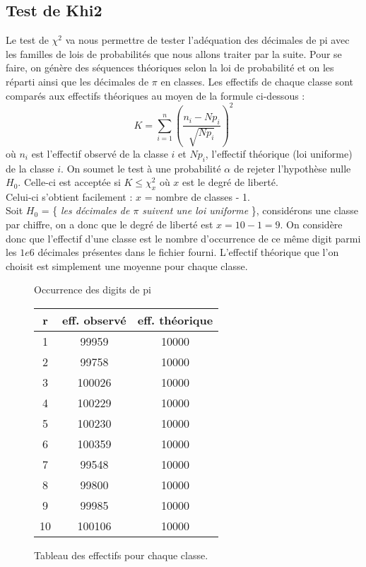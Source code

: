 \documentclass[a4paper,10pt]{article}
\begin{document}
\subsection{Test de Khi2}
Le test de $\chi^2$ va nous permettre de tester l'adéquation des décimales de pi avec les familles de lois de probabilités que nous allons traiter par la suite. Pour se faire, on génère des séquences théoriques selon la loi de probabilité et on les réparti ainsi que les décimales de $\pi$ en classes. Les effectifs de chaque classe sont comparés aux effectifs théoriques au moyen de la formule ci-dessous :
\[ K = \displaystyle\sum_{i=1}^n (\frac{n_i-Np_i}{\sqrt{Np_i}})^2\]
où $n_i$ est l'effectif observé de la classe $i$ et $Np_i$, l'effectif théorique (loi uniforme) de la classe $i$. On soumet le test à une probabilité $\alpha$ de rejeter l'hypothèse nulle $H_0$. Celle-ci est acceptée si $K \leq \chi_x^2$ où $x$ est le degré de liberté. \\Celui-ci s'obtient facilement : $x$ = nombre de classes - 1. \\

Soit $H_0$ = \{\textit{ les décimales de $\pi$ suivent une loi uniforme }\}, considérons une classe par chiffre, on a donc que le degré de liberté est $x = 10 - 1 = 9 $. On considère donc que l'effectif d'une classe est le nombre d'occurrence de ce même digit parmi les $1e6$ décimales présentes dans le fichier fourni. L'effectif théorique que l'on choisit est simplement une moyenne pour chaque classe.
\begin{figure}[h!]
\caption{Occurrence des digits de pi}
\label{khi2histo}
\end{figure}

\begin{figure}[h!]
\begin{center}
\begin{tabular}{|c|c|c|}
\hline
r & eff. observé & eff. théorique \\
\hline
1 & 99959 & 10000\\
2 & 99758 & 10000\\
3 & 100026 & 10000\\
4 & 100229 & 10000\\
5 & 100230 & 10000\\
6 & 100359 & 10000\\
7 & 99548 & 10000\\
8 & 99800 & 10000\\
9 & 99985 & 10000\\
10 & 100106 & 10000\\
\hline
\end{tabular}
\end{center}
\caption{Tableau des effectifs pour chaque classe.}
\end{figure}
\end{document}
